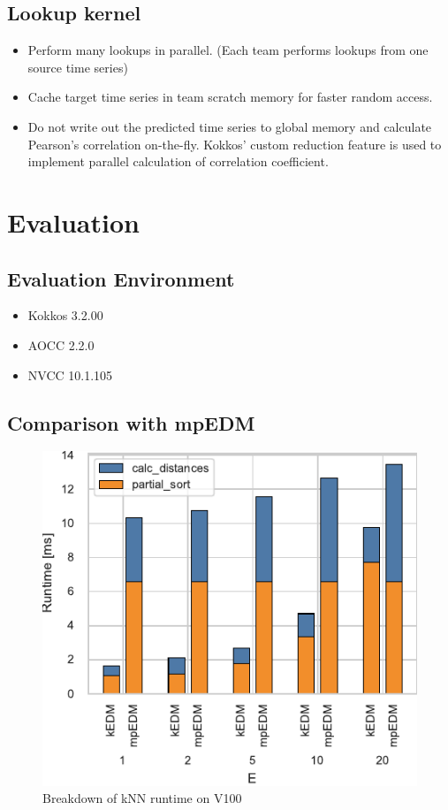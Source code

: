 \documentclass[conference]{IEEEtran}
\begin{document}
\subsection{Lookup kernel}

\begin{itemize}
\item Perform many lookups in parallel. (Each team performs lookups from one
    source time series)
\item Cache target time series in team scratch memory for faster random
    access.
\item Do not write out the predicted time series to global memory and
    calculate Pearson’s correlation on-the-fly. Kokkos’ custom reduction
    feature is used to implement parallel calculation of correlation
    coefficient.
\end{itemize}

\section{Evaluation}

\subsection{Evaluation Environment}

\begin{itemize}
    \item Kokkos 3.2.00
    \item AOCC 2.2.0
    \item NVCC 10.1.105
\end{itemize}

\subsection{Comparison with mpEDM}

\begin{figure}
    \centering
    \includegraphics{figs/breakdown_v100}
    \caption{Breakdown of kNN runtime on V100}%
    \label{fig:architecture}
\end{figure}
\end{document}

